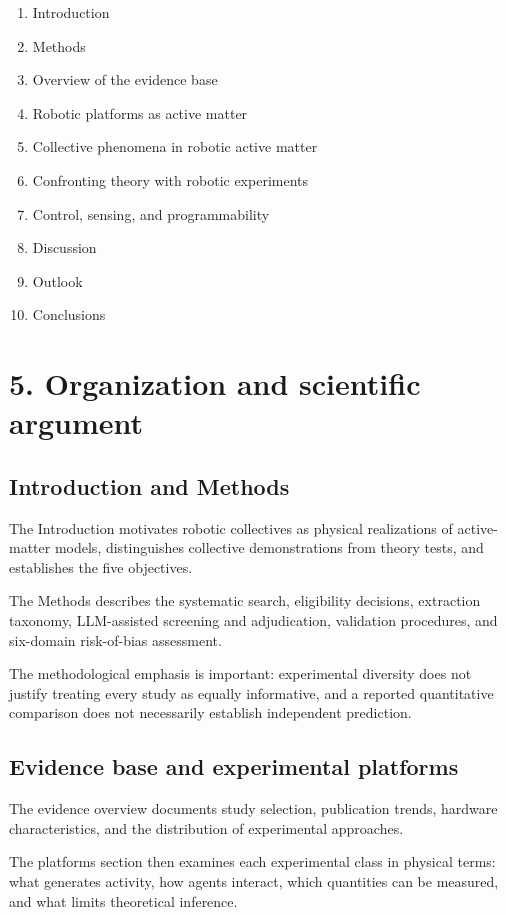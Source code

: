 \begin{enumerate}
\item Introduction
\item Methods
\item Overview of the evidence base
\item Robotic platforms as active matter
\item Collective phenomena in robotic active matter
\item Confronting theory with robotic experiments
\item Control, sensing, and programmability
\item Discussion
\item Outlook
\item Conclusions
\end{enumerate}

\section*{5. Organization and scientific argument}

\subsection*{Introduction and Methods}

The Introduction motivates robotic collectives
as physical realizations of active-matter models,
distinguishes collective demonstrations from
theory tests, and establishes the five objectives.

The Methods describes the systematic search,
eligibility decisions, extraction taxonomy,
LLM-assisted screening and adjudication,
validation procedures, and six-domain
risk-of-bias assessment.

The methodological emphasis is important:
experimental diversity does not justify
treating every study as equally informative,
and a reported quantitative comparison
does not necessarily establish
independent prediction.

\subsection*{Evidence base and experimental platforms}

The evidence overview documents study selection,
publication trends, hardware characteristics,
and the distribution of experimental approaches.

The platforms section then examines each
experimental class in physical terms:
what generates activity, how agents interact,
which quantities can be measured, and
what limits theoretical inference.

